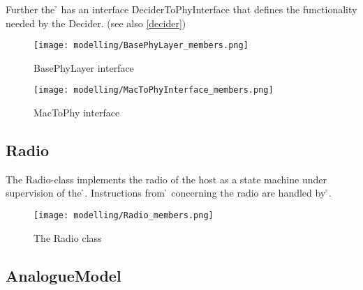 Further the \h{\bp} has an interface \h{DeciderToPhyInterface} that defines the functionality
needed by the Decider. (see also \ref{decider})
\label{SignalCreation}

\begin{figure}[H]
 \centering
 \texttt{[image: modelling/BasePhyLayer\_members.png]}
 \caption{BasePhyLayer interface}
 \label{fig: BasePhyLayer interface}
\end{figure}

\begin{figure}[H]
 \centering
 \texttt{[image: modelling/MacToPhyInterface\_members.png]}
 \caption{MacToPhy interface}
 \label{fig: The MacToPhyInterface}
\end{figure}

\subsection{Radio}
\label{radio}

The Radio-class implements the radio of the host as a state machine under supervision
of the \h{\bp}. Instructions from \h{\bm} concerning the radio are handled by \h{\bp}.

\begin{figure}[H]
 \centering
 \texttt{[image: modelling/Radio\_members.png]}
 \caption{The Radio class}
 \label{fig: radio}
\end{figure}

\subsection{AnalogueModel}



